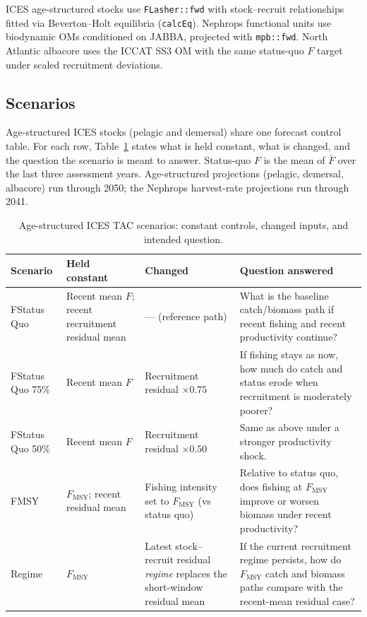 ICES age-structured stocks use \texttt{FLasher::fwd} with stock--recruit
relationships fitted via Beverton--Holt equilibria (\texttt{calcEq}). Nephrops
functional units use biodynamic OMs conditioned on JABBA, projected with
\texttt{mpb::fwd}. North Atlantic albacore uses the ICCAT SS3 OM with the same
status-quo $F$ target under scaled recruitment deviations.

\subsection{Scenarios}
\label{sec:tac-scenarios}

Age-structured ICES stocks (pelagic and demersal) share one forecast control
table. For each row, Table~\ref{tab:tac-scen} states what is held constant,
what is changed, and the question the scenario is meant to answer.
Status-quo $F$ is the mean of $\bar{F}$ over the last three assessment years.
Age-structured projections (pelagic, demersal, albacore) run through 2050;
the Nephrops harvest-rate projections run through 2041.

\begin{table}[htbp]
\centering
\caption{Age-structured ICES TAC scenarios: constant controls, changed
inputs, and intended question.}
\label{tab:tac-scen}
\small
\begin{tabular}{@{}p{}p{}p{}p{}@{}}
\toprule
Scenario & Held constant & Changed & Question answered \\
\midrule
FStatus Quo
  & Recent mean $F$; recent recruitment residual mean
  & --- (reference path)
  & What is the baseline catch/biomass path if recent fishing and recent
    productivity continue? \\
\addlinespace
FStatus Quo 75\%
  & Recent mean $F$
  & Recruitment residual $\times 0.75$
  & If fishing stays as now, how much do catch and status erode when
    recruitment is moderately poorer? \\
\addlinespace
FStatus Quo 50\%
  & Recent mean $F$
  & Recruitment residual $\times 0.50$
  & Same as above under a stronger productivity shock. \\
\addlinespace
FMSY
  & $F_{\mathrm{MSY}}$; recent residual mean
  & Fishing intensity set to $F_{\mathrm{MSY}}$ (vs status quo)
  & Relative to status quo, does fishing at $F_{\mathrm{MSY}}$ improve or
    worsen biomass under recent productivity? \\
\addlinespace
Regime
  & $F_{\mathrm{MSY}}$
  & Latest stock--recruit residual \emph{regime} replaces the short-window
    residual mean
  & If the current recruitment regime persists, how do $F_{\mathrm{MSY}}$
    catch and biomass paths compare with the recent-mean residual case? \\
\bottomrule
\end{tabular}
\end{table}

